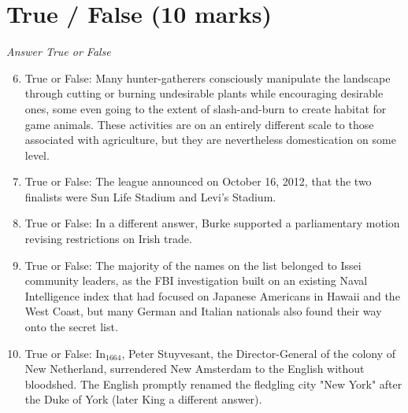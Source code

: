 \documentclass[12pt]{article}
\begin{document}
\section*{True / False (10 marks)}
\textit{Answer True or False}
\begin{enumerate}[label=\arabic*.]
\setcounter{enumi}{5}
\item True or False: Many hunter-gatherers consciously manipulate the landscape through cutting or burning undesirable plants while encouraging desirable ones, some even going to the extent of slash-and-burn to create habitat for game animals. These activities are on an entirely different scale to those associated with agriculture, but they are nevertheless domestication on some level.
\item True or False: The league announced on October 16, 2012, that the two finalists were Sun Life Stadium and Levi's Stadium.
\item True or False: In a different answer, Burke supported a parliamentary motion revising restrictions on Irish trade.
\item True or False: The majority of the names on the list belonged to Issei community leaders, as the FBI investigation built on an existing Naval Intelligence index that had focused on Japanese Americans in Hawaii and the West Coast, but many German and Italian nationals also found their way onto the secret list.
\item True or False: In$_{1664}$, Peter Stuyvesant, the Director-General of the colony of New Netherland, surrendered New Amsterdam to the English without bloodshed. The English promptly renamed the fledgling city "New York" after the Duke of York (later King a different answer).
\end{enumerate}
\end{document}
